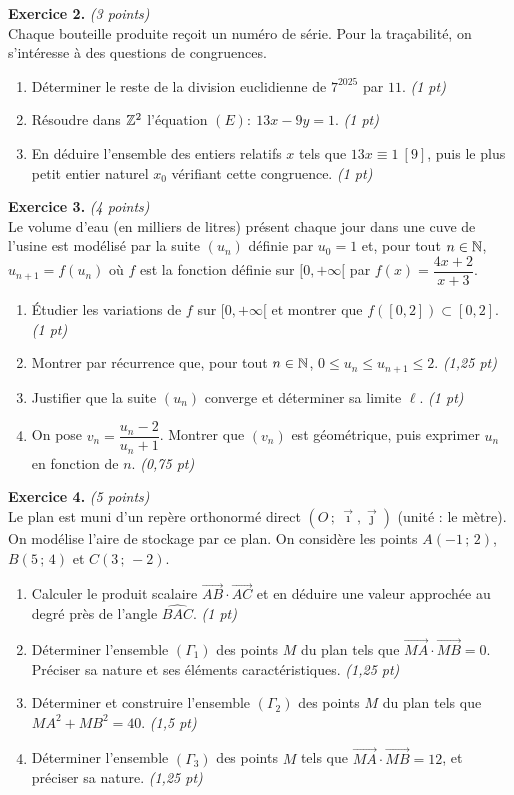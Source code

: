 \smallskip
\noindent\textbf{Exercice 2.} \hfill\textit{(3 points)}\\
Chaque bouteille produite reçoit un numéro de série. Pour la traçabilité, on s'intéresse
à des questions de congruences.
\begin{enumerate}[label=\arabic*)]
\item Déterminer le reste de la division euclidienne de $7^{2025}$ par $11$. \hfill\textit{(1 pt)}
\item Résoudre dans $\mathbb{Z}^2$ l'équation $(E):\ 13x-9y=1$. \hfill\textit{(1 pt)}
\item En déduire l'ensemble des entiers relatifs $x$ tels que $13x\equiv 1\ [9]$, puis
le plus petit entier naturel $x_0$ vérifiant cette congruence. \hfill\textit{(1 pt)}
\end{enumerate}

\smallskip
\noindent\textbf{Exercice 3.} \hfill\textit{(4 points)}\\
Le volume d'eau (en milliers de litres) présent chaque jour dans une cuve de l'usine est
modélisé par la suite $(u_n)$ définie par $u_0=1$ et, pour tout $n\in\mathbb{N}$,
$u_{n+1}=f(u_n)$ où $f$ est la fonction définie sur $[0,+\infty[$ par
$f(x)=\dfrac{4x+2}{x+3}$.
\begin{enumerate}[label=\arabic*)]
\item Étudier les variations de $f$ sur $[0,+\infty[$ et montrer que $f([0,2])\subset[0,2]$. \hfill\textit{(1 pt)}
\item Montrer par récurrence que, pour tout $n\in\mathbb{N}$, $0\le u_n\le u_{n+1}\le 2$. \hfill\textit{(1,25 pt)}
\item Justifier que la suite $(u_n)$ converge et déterminer sa limite $\ell$. \hfill\textit{(1 pt)}
\item On pose $v_n=\dfrac{u_n-2}{u_n+1}$. Montrer que $(v_n)$ est géométrique, puis
exprimer $u_n$ en fonction de $n$. \hfill\textit{(0,75 pt)}
\end{enumerate}

\smallskip
\noindent\textbf{Exercice 4.} \hfill\textit{(5 points)}\\
Le plan est muni d'un repère orthonormé direct $(O\,;\,\vec\imath,\vec\jmath)$ (unité :
le mètre). On modélise l'aire de stockage par ce plan. On considère les points
$A(-1\,;\,2)$, $B(5\,;\,4)$ et $C(3\,;\,-2)$.
\begin{enumerate}[label=\arabic*)]
\item Calculer le produit scalaire $\vec{AB}\cdot\vec{AC}$ et en déduire une valeur
approchée au degré près de l'angle $\widehat{BAC}$. \hfill\textit{(1 pt)}
\item Déterminer l'ensemble $(\Gamma_1)$ des points $M$ du plan tels que
$\vec{MA}\cdot\vec{MB}=0$. Préciser sa nature et ses éléments caractéristiques. \hfill\textit{(1,25 pt)}
\item Déterminer et construire l'ensemble $(\Gamma_2)$ des points $M$ du plan tels que
$MA^2+MB^2=40$. \hfill\textit{(1,5 pt)}
\item Déterminer l'ensemble $(\Gamma_3)$ des points $M$ tels que
$\vec{MA}\cdot\vec{MB}=12$, et préciser sa nature. \hfill\textit{(1,25 pt)}
\end{enumerate}

